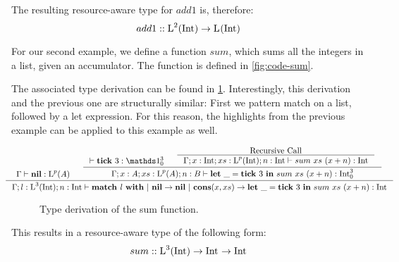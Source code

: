 \begin{example}
The resulting resource-aware type for \(add1\) is, therefore:
\[
   add1 :: \text{L}^{2}(\text{Int}) \to \text{L}^{}(\text{Int}) ^{}_{}
\]
\end{example}

\begin{example}
   For our second example, we define a function \(sum\), which sums all the integers in a list, given an accumulator. The function is defined in \cref{fig:code-sum}.
\end{example}

The associated type derivation can be found in \cref{fig:type-derivation-sum}. Interestingly, this derivation and the previous one are structurally similar: First we pattern match on a list, followed by a let expression. For this reason, the highlights from the previous example can be applied to this example as well.

\begin{figure}[H]
\begin{center}
   \[
      \hspace*{-1.5cm}
      \inference
      {
         \typing{\Gamma}{\listnil}{\ralist{p}{A}}
         &
         \inference
         {
            \typing{}{\tick{3}}{\ratype{\unit}{3}{0}}
            &
            \inference
            {
               \text{Recursive Call}
            }
            {
               \typing
               {\Gamma;x:\typeint;xs:\ralist{p}{\typeint};n:\typeint}
               {sum~xs~(x+n)}
               {\typeint}
            }
         }
         {
            \typing
            {\Gamma;x:A;xs:\ralist{p}{A};n:B}
            {\letexp{\_}{\tick{3}}{sum~xs~(x+n)}}
            {\ratype{\typeint}{3}{0}}
         }
      }
      {
         \typing
         {\Gamma;l:\ralist{3}{\typeint};n:\typeint}
         {\listmatch{l}{\listnil}{\letexp{\_}{\tick{3}}{sum~xs~(x+n)}}}
         {\typeint}
      }
   \]
   \end{center}
   \caption{Type derivation of the sum function.}
   \label{fig:type-derivation-sum}
\end{figure}

This results in a resource-aware type of the following form:
\[
   sum :: \text{L}^{3}(\text{Int}) \to \text{Int} ^{}_{} \to \text{Int} ^{}_{}
\]













